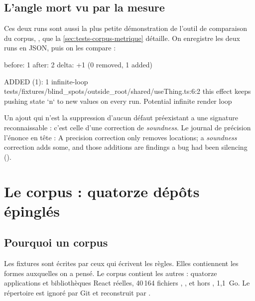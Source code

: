\subsection{L'angle mort vu par la mesure}

Ces deux runs sont aussi la plus petite démonstration de l'outil de comparaison du corpus, , que la \cref{sec:tests-corpus-metrique} détaille. On enregistre les deux runs en JSON, puis on les compare :

\begin{sortie}
before: 1
after:  2
delta:  +1  (0 removed, 1 added)

ADDED (1):
      1  infinite-loop
    tests/fixtures/blind_spots/outside_root/shared/useThing.ts:6:2  this effect keeps pushing state `n` to new values on every run. Potential infinite render loop
\end{sortie}

Un ajout qui n'est la suppression d'aucun défaut préexistant a une signature reconnaissable : c'est celle d'une correction de \emph{soundness}. Le journal de précision l'énonce en tête : \og A precision correction only removes locations; a \emph{soundness} correction adds some, and those additions are findings a bug had been silencing\fg{} ().

\section{Le corpus : quatorze dépôts épinglés}
\label{sec:tests-corpus-corpus}

\subsection{Pourquoi un corpus}

Les fixtures sont écrites par ceux qui écrivent les règles. Elles contiennent les formes auxquelles on a pensé. Le corpus contient les autres : quatorze applications et bibliothèques React réelles, 40\,164 fichiers , ,  et  hors , 1,1~Go. Le répertoire  est ignoré par Git et reconstruit par .

